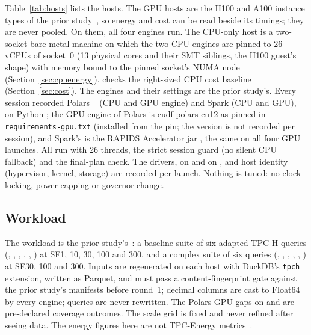\documentclass[sigconf]{acmart}
\begin{document}
Table~\ref{tab:hosts} lists the hosts. The GPU hosts are the H100 and A100 instance types of
the prior study~\cite{ejiofor2026p1}, so energy and cost can be read beside its timings; they
are never pooled. On them, all four engines run. The CPU-only host \CG{} is a two-socket
bare-metal machine on which the two CPU engines are pinned to 26 vCPUs of socket~0 (13
physical cores and their SMT siblings, the H100 guest's shape) with memory bound to the
pinned socket's NUMA node (Section~\ref{sec:cpuenergy}). \CV{} checks the right-sized CPU cost baseline (Section~\ref{sec:cost}). The engines and their settings are the prior study's. Every session recorded Polars
~\cite{polars1442} (CPU and GPU engine) and Spark 
(CPU and GPU), on Python ; the GPU engine of Polars is cudf-polars-cu12
 as pinned in \texttt{requirements-gpu.txt} (installed from the pin; the
version is not recorded per session), and Spark's is the RAPIDS Accelerator jar
, the same on all four GPU launches. All run with 26 threads, the strict
\polarsgpu{} session guard (no silent CPU fallback) and the \sparkgpu{} final-plan check. The drivers,
 on \GH{} and  on \GA, and host identity
(hypervisor, kernel, storage) are recorded per launch.
Nothing is tuned: no clock locking, power capping or governor change.

\subsection{Workload}
\label{sec:workload}
The workload is the prior study's~\cite{ejiofor2026p1}: a baseline suite of six adapted TPC-H
queries (, , , , , ) at SF1, 10, 30, 100 and 300, and
a complex suite of six queries (, , , ,
, ) at SF30, 100 and 300. Inputs are regenerated on each host
with DuckDB's \texttt{tpch} extension, written as Parquet, and must pass a content-fingerprint
gate against the prior study's manifests before round~1; decimal columns are cast to Float64
by every engine; queries are never rewritten. The Polars GPU gaps on  and
 are pre-declared coverage outcomes. The scale grid is fixed and never refined
after seeing data. \tpcdisclaimer{} The energy figures here are not TPC-Energy
metrics~\cite{tpcenergy150}.
\end{document}
